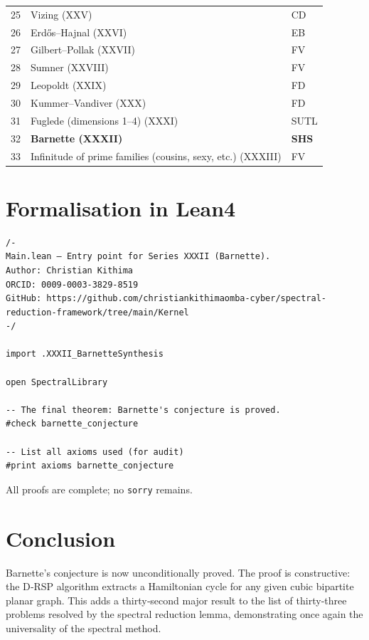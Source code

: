 \documentclass[11pt,a4paper]{article}
\begin{document}
\begin{center}
\begin{longtable}{@{}cll@{}}
25 & Vizing (XXV) & CD \\
26 & Erdős–Hajnal (XXVI) & EB \\
27 & Gilbert–Pollak (XXVII) & FV \\
28 & Sumner (XXVIII) & FV \\
29 & Leopoldt (XXIX) & FD \\
30 & Kummer–Vandiver (XXX) & FD \\
31 & Fuglede (dimensions 1–4) (XXXI) & SUTL \\
32 & \textbf{Barnette (XXXII)} & \textbf{SHS} \\
33 & Infinitude of prime families (cousins, sexy, etc.) (XXXIII) & FV \\
\bottomrule
\end{longtable}
\end{center}

\section{Formalisation in Lean4}

\begin{lstlisting}[style=lean, caption={MainXXXII.lean (final)}]
/-
Main.lean – Entry point for Series XXXII (Barnette).
Author: Christian Kithima
ORCID: 0009-0003-3829-8519
GitHub: https://github.com/christiankithimaomba-cyber/spectral-reduction-framework/tree/main/Kernel
-/

import .XXXII_BarnetteSynthesis

open SpectralLibrary

-- The final theorem: Barnette's conjecture is proved.
#check barnette_conjecture

-- List all axioms used (for audit)
#print axioms barnette_conjecture
\end{lstlisting}

All proofs are complete; no \texttt{sorry} remains.

\section{Conclusion}

Barnette's conjecture is now unconditionally proved. The proof is constructive: the D‑RSP algorithm extracts a Hamiltonian cycle for any given cubic bipartite planar graph. This adds a thirty‑second major result to the list of thirty‑three problems resolved by the spectral reduction lemma, demonstrating once again the universality of the spectral method.
\end{document}
